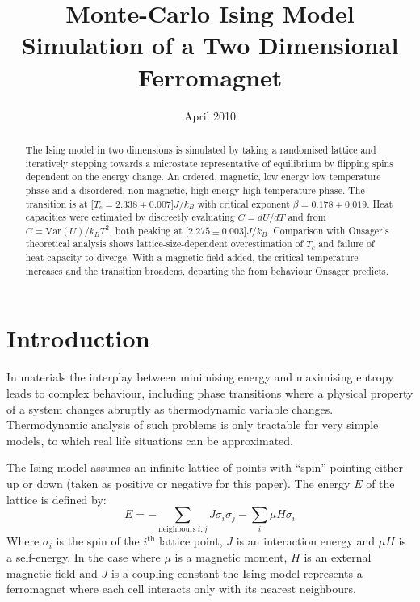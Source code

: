 \documentclass[12pt,a4paper,english]{article}
\author{}
\date{April 2010}
\title{Monte-Carlo Ising Model Simulation of a Two Dimensional Ferromagnet}
\begin{document}
\maketitle

\begin{abstract}
The Ising model in two dimensions is simulated by taking a randomised lattice and iteratively stepping towards a microstate representative of equilibrium by flipping spins dependent on the energy change. An ordered, magnetic, low energy low temperature phase and a disordered, non-magnetic, high energy high temperature phase. The transition is at \unit[$T_c=2.338\pm0.007$]{$J/k_B$} with critical exponent $\beta=0.178\pm0.019$. Heat capacities were estimated by discreetly evaluating $C=dU/dT$ and from $C=\textrm{Var}\left(U\right)/k_B T^2$, both peaking at \unit[$2.275\pm0.003$]{$J/k_B$}. Comparison with Onsager's theoretical analysis shows lattice-size-dependent overestimation of $T_c$ and failure of heat capacity to diverge.  With a magnetic field added, the critical temperature increases and the transition broadens, departing the from behaviour Onsager predicts.
\end{abstract}

\section{Introduction}
\label{sec:introduction}
In materials the interplay between minimising energy and maximising entropy leads to complex behaviour, including phase transitions where a physical property of a system changes abruptly as thermodynamic variable changes.  Thermodynamic analysis of such problems is only tractable for very simple models, to which real life situations can be approximated.

The Ising model\cite{brush67} assumes an infinite lattice of points with ``spin'' pointing either up or down (taken as positive or negative for this paper).  The energy $E$ of the lattice is defined by:
\begin{equation}
\label{eq:ising-energy}
E = - \sum_{\mathrm{neighbours}\: i,j} J \sigma_i \sigma_j - \sum_i \mu H \sigma_i
\end{equation}
Where $\sigma_i$ is the spin of the $i^\textrm{th}$ lattice point, $J$ is an interaction energy and $\mu H$ is a self-energy.  In the case where $\mu$ is a magnetic moment, $H$ is an external magnetic field and $J$ is a coupling constant the Ising model represents a ferromagnet where each cell interacts only with its nearest neighbours.
\end{document}
